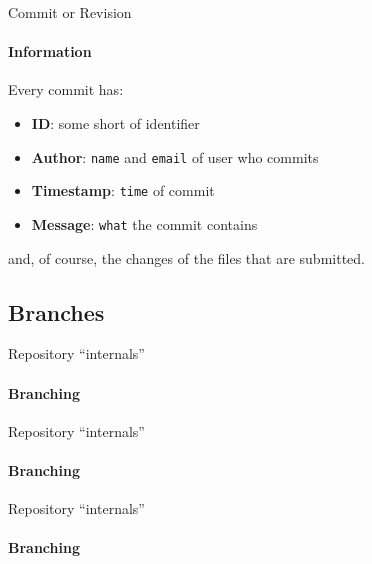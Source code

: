 \documentclass{beamer}
\begin{document}
    \begin{frame}{Commit or Revision}
\framesubtitle{Information}%
Every commit has:
\begin{itemize}
	\item \textbf{ID}: some short of identifier
	\item \textbf{Author}: \texttt{name} and \texttt{email} of user who commits
	\item \textbf{Timestamp}: \texttt{time} of commit
	\item \textbf{Message}: \texttt{what} the commit contains
\end{itemize}
and, of course, the \alert{changes} of the files that are submitted.
\end{frame}

\subsection{Branches}
\begin{frame}{Repository ``internals''}
\framesubtitle{Branching}%
\begin{figure}
	\centering
\end{figure}
\end{frame}

\begin{frame}{Repository ``internals''}
\framesubtitle{Branching}%
\begin{figure}
	\centering
\end{figure}
\end{frame}

\begin{frame}{Repository ``internals''}
\framesubtitle{Branching}%
\begin{figure}
	\centering
\end{figure}
\end{frame}
\end{document}

